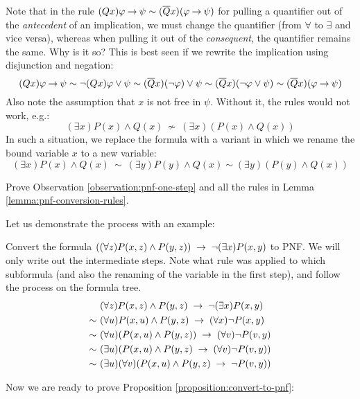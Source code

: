 Note that in the rule $(Qx)\varphi \mathbin{\rightarrow} \psi\sim(\overline{Q}x)(\varphi \mathbin{\rightarrow} \psi)$ for pulling a quantifier out of the \emph{antecedent} of an implication, we must change the quantifier (from $\forall$ to $\exists$ and vice versa), whereas when pulling it out of the \emph{consequent}, the quantifier remains the same. Why is it so? This is best seen if we rewrite the implication using disjunction and negation:
$$
(Qx)\varphi \mathbin{\rightarrow} \psi\sim\neg(Qx)\varphi \lor\psi\sim(\overline{Q}x)(\neg\varphi)\lor\psi\sim(\overline{Q}x)(\neg\varphi\lor\psi)\sim (\overline{Q}x)(\varphi \mathbin{\rightarrow} \psi)
$$
Also note the assumption that $x$ is not free in $\psi$. Without it, the rules would not work, e.g.:
$$
(\exists x)P(x)\land Q(x)\ \not\sim\ (\exists x)(P(x)\land Q(x))
$$
In such a situation, we replace the formula with a variant in which we rename the bound variable $x$ to a new variable:
$$
(\exists x)P(x)\land Q(x)\ \sim\ (\exists y)P(y)\land Q(x) \sim (\exists y)(P(y)\land Q(x))
$$
\begin{exercise}
    Prove Observation \ref{observation:pnf-one-step} and all the rules in Lemma \ref{lemma:pnf-conversion-rules}.
\end{exercise}

Let us demonstrate the process with an example:

\begin{example}\label{example:convert-to-pnf}
    Convert the formula $((\forall z)P(x,z)\land P(y,z))\ \limplies\ \neg(\exists x)P(x,y)$ to PNF. We will only write out the intermediate steps. Note what rule was applied to which subformula (and also the renaming of the variable in the first step), and follow the process on the formula tree.
    \begin{align*}
        &\ (\forall z)P(x,z)\land P(y,z)\ \limplies\ \neg(\exists x)P(x,y)\\ \sim &\ 
        (\forall u) P(x,u)\land P(y,z)\ \limplies\ (\forall x)\neg P(x,y)\\ \sim &\ 
        (\forall u)(P(x,u)\land P(y,z))\ \limplies\ (\forall v)\neg P(v,y)\\ \sim &\ 
        (\exists u)( P(x,u)\land P(y,z)\ \limplies\ (\forall v)\neg P(v,y))\\ \sim &\ 
        (\exists u)(\forall v)( P(x,u)\land P(y,z)\ \limplies\ \neg P(v,y))
    \end{align*}    
\end{example}

Now we are ready to prove Proposition \ref{proposition:convert-to-pnf}:

